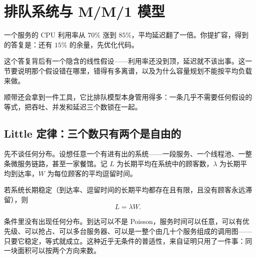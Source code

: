 \section{排队系统与 M/M/1 模型}
\label{sec:06-Random-Processes/05-Continuous-Time-Markov-Chains-and-Queues/04}

一个服务的 CPU 利用率从 \(70\%\) 涨到 \(85\%\)，平均延迟翻了一倍。你提扩容，得到的答复是：还有 \(15\%\) 的余量，先优化代码。

这个答复背后有一个隐含的线性假设——利用率还没到顶，延迟就不该出事。这一节要说明那个假设错在哪里，错得有多离谱，以及为什么容量规划不能按平均负载来做。

顺带还会拿到一件工具，它比排队模型本身管用得多：一条几乎不需要任何假设的等式，把吞吐、并发和延迟三个数锁在一起。

\subsection{Little 定律：三个数只有两个是自由的}

先不谈任何分布。设想任意一个有进有出的系统——一段服务、一个线程池、一整条微服务链路，甚至一家餐馆。记 \(L\) 为长期平均在系统中的顾客数，\(\lambda\) 为长期平均到达率，\(W\) 为每位顾客的平均逗留时间。

\begin{theorem}
若系统长期稳定（到达率、逗留时间的长期平均都存在且有限，且没有顾客永远滞留），则
\[
L=\lambda W.
\]
\end{theorem}

条件里没有出现任何分布。到达可以不是 Poisson，服务时间可以任意，可以有优先级、可以抢占、可以多台服务器、可以是一整个由几十个服务组成的调用图——只要它稳定，等式就成立。这种近乎无条件的普适性，来自证明只用了一件事：同一块面积可以按两个方向来数。

